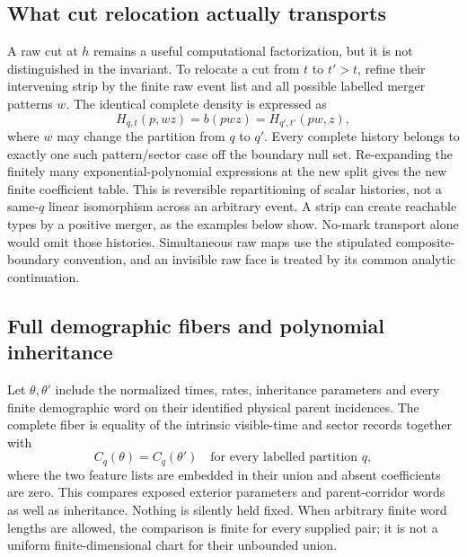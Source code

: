 \documentclass[11pt]{article}
\begin{document}
\subsection{What cut relocation actually transports}

A raw cut at $h$ remains a useful computational factorization, but it is not distinguished in the invariant.  To relocate a cut from $t$ to $t'>t$, refine their intervening strip by the finite raw event list and all possible labelled merger patterns $w$.  The identical complete density is expressed as
\[
H_{q,t}(p,wz)=b(pwz)=H_{q',t'}(pw,z),
\]
where $w$ may change the partition from $q$ to $q'$.  Every complete history belongs to exactly one such pattern/sector case off the boundary null set.  Re-expanding the finitely many exponential-polynomial expressions at the new split gives the new finite coefficient table.  This is reversible repartitioning of scalar histories, not a same-$q$ linear isomorphism across an arbitrary event.  A strip can create reachable types by a positive merger, as the examples below show.  No-mark transport alone would omit those histories.  Simultaneous raw maps use the stipulated composite-boundary convention, and an invisible raw face is treated by its common analytic continuation.

\subsection{Full demographic fibers and polynomial inheritance}

Let $\theta,\theta'$ include the normalized times, rates, inheritance parameters and every finite demographic word on their identified physical parent incidences.  The complete fiber is equality of the intrinsic visible-time and sector records together with
\begin{equation}
C_q(\theta)=C_q(\theta')\quad\text{for every labelled partition }q,
\label{eq:supp-full-port-fiber}
\end{equation}
where the two feature lists are embedded in their union and absent coefficients are zero.  This compares exposed exterior parameters and parent-corridor words as well as inheritance.  Nothing is silently held fixed.  When arbitrary finite word lengths are allowed, the comparison is finite for every supplied pair; it is not a uniform finite-dimensional chart for their unbounded union.
\end{document}

